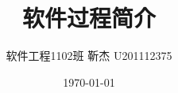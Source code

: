 \documentclass[UTF8,nofonts]{ctexart}
\title{\Huge 软件过程简介}
\author{\large	
  软件工程1102班 靳杰 U201112375}
\date{\Large\today}
\begin{document}
\maketitle
\onecolumn{
\tableofcontents}
\newpage
\end{document}
